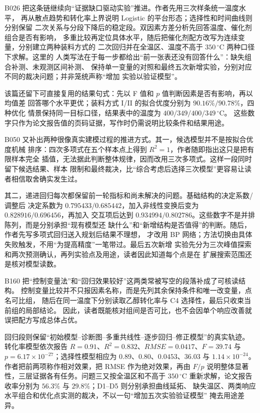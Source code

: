 B026 把这条链继续向“证据缺口驱动实验”推进。作者先用三次样条统一温度水平，
再从散点趋势和转化率上界说明 Logistic 的平台形态；选择性和时间曲线则分别保留
二次关系与分段下降后的稳定段。双因素方差分析先回答温度、催化剂组合是否有影响，
多重比较再定位具体水平，随后把催化剂配方改写为连续变量，分别建立两种装料方式的
二次回归并在全温区、温度不高于 $350\,^{\circ}\mathrm{C}$ 两种口径下求解。这里的
人类写法在于每一步都给出“前一张表还没有回答什么”：缺失组合补测、未观测区间补测、
保持单一变量的对照和最终五次新增实验，分别对应不同的裁决问题；并非笼统声称“增加
实验以验证模型”。

该篇还留下可直接复用的结果句式：先以 F 值和 $p$ 值判断因素是否有影响，再以均值差
回答哪个水平更优；装料方式 I/II 的拟合优度分别为 $90.16\%/90.78\%$，四种优化
情景保持同一目标口径，结果表中的温度为 $400/349/400/349\,^{\circ}\mathrm{C}$。
这些数字只作为论文报告值的页码证据，写作时仍需说明比较条件和结果用途。

B050 又补出两种很像真实建模过程的推进方式。其一，候选模型并不是按拟合优度机械
排序：四次多项式在五个样本点上得到 $R^2=1$，作者随即指出这只是把有限样本完全
插值，无法据此判断整体规律，因而改用三次多项式。这样一段同时留下候选结果、样本
限制和最终裁决，比“综合考虑后选择三次模型”更容易让读者相信取舍确实发生过。

其二，递进回归每次都保留前一轮指标和尚未解决的问题。基础结构的决定系数/调整后
决定系数为 $0.795433/0.685442$，加入非线性变换后变为 $0.828916/0.696456$，再加入
交互项后达到 $0.934994/0.802786$。这些数字不是并排陈列，而是分别承担“现有模型还
缺什么”和“新增结构是否值得”的判断。随后，作者先写多项式回归送入规划后结果不理想，
才改用 BP 网络；方法切换由具体失败触发，不用“为提高精度”一笔带过。最后五次新增
实验先分为三次峰值探索和两次预测确认，再列实验点及用途，读者因此知道每个点是在
扩展搜索范围还是核对模型读数。

B160 把“控制变量法”和“回归效果较好”这两类常被写空的段落补成了可核读结构。
控制变量比较并不只报因素名称，而是先列其余保持条件和唯一改变量，点名可比组，
随后在同一温度下分别读取乙醇转化率与 C4 选择性，最后只收束当前组的局部结论。
因此，读者既能核对组间是否可比，也不会因单个响应改善就误把配方写成总体占优。

回归段则保留“初始模型--诊断图--多重共线性--逐步回归--修正模型”的真实轨迹。
转化率模型依次报告 $R=0.91$、$R^2=0.832$、$RMSE=0.0417$、$F=39.74$ 与
$p=6.17\times10^{-27}$；选择性模型相应为 $0.89$、$0.80$、$0.0453$、$36.03$ 与
$1.14\times10^{-24}$。作者把前两项称作相对效果，把 RMSE 作为绝对效果，再由 $F/p$
说明整体显著性，三层证据各有任务。问题三又按全温区和不高于 $350\,^{\circ}\mathrm{C}$
重新求解，论文报告收率分别为 $56.3\%$ 与 $29.8\%$；D1--D5 则分别承担曲线延拓、
缺失温区、两类响应水平组合和优化点实测的裁决，不以一句“增加五次实验验证模型”
掩去用途差异。

